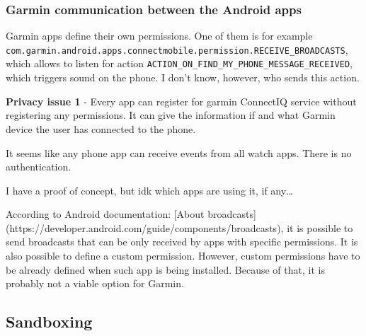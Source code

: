 \subsubsection{Garmin communication between the Android apps}
Garmin apps define their own permissions.
One of them is for example \verb|com.garmin.android.apps.connectmobile.permission.RECEIVE_BROADCASTS|, which allows to listen for action \verb|ACTION_ON_FIND_MY_PHONE_MESSAGE_RECEIVED|, which triggers sound on the phone.
I don't know, however, who sends this action.

\textbf{Privacy issue 1} - Every app can register for garmin ConnectIQ service without registering any permissions.
It can give the information if and what Garmin device the user has connected to the phone.

It seems like any phone app can receive events from all watch apps.
There is no authentication.

I have a proof of concept, but idk which apps are using it, if any\ldots

According to Android documentation: [About broadcasts](https://developer.android.com/guide/components/broadcasts),
it is possible to send broadcasts that can be only received by apps with specific permissions.
It is also possible to define a custom permission.
However, custom permissions have to be already defined when such app is being installed.
Because of that, it is probably not a viable option for Garmin.


\subsection{Sandboxing}
